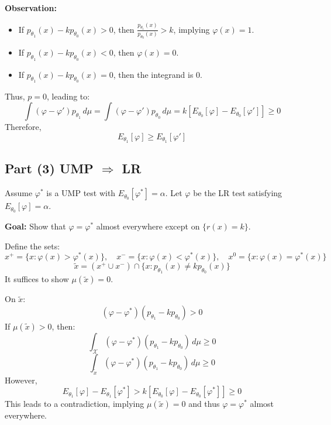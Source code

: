 \documentclass[open=any, 11pt,paper=A4]{scrreprt}
\begin{document}
\textbf{Observation:}
\begin{itemize}
    \item If \( p_{\theta_1}(x) - k p_{\theta_0}(x) > 0 \), then \( \frac{p_{\theta_1}(x)}{p_{\theta_0}(x)} > k \), implying \( \varphi(x) = 1 \).
    \item If \( p_{\theta_1}(x) - k p_{\theta_0}(x) < 0 \), then \( \varphi(x) = 0 \).
    \item If \( p_{\theta_1}(x) - k p_{\theta_0}(x) = 0 \), then the integrand is \( 0 \).
\end{itemize}
Thus, \( p = 0 \), leading to:
\[
\int (\varphi - \varphi') p_{\theta_1} \, d\mu = \int (\varphi - \varphi') p_{\theta_0} \, d\mu = k \left[ E_{\theta_0}[\varphi] - E_{\theta_0}[\varphi'] \right] \geq 0
\]
Therefore,
\[
E_{\theta_1}[\varphi] \geq E_{\theta_1}[\varphi']
\]

\subsection*{Part (3) UMP \(\Rightarrow\) LR}
Assume \( \varphi^* \) is a UMP test with \( E_{\theta_0}[\varphi^*] = \alpha \). Let \( \varphi \) be the LR test satisfying \( E_{\theta_0}[\varphi] = \alpha \).

\textbf{Goal:} Show that \( \varphi = \varphi^* \) almost everywhere except on \( \{ r(x) = k \} \).

Define the sets:
\[
x^+ = \{ x : \varphi(x) > \varphi^*(x) \}, \quad 
x^- = \{ x : \varphi(x) < \varphi^*(x) \}, \quad
x^0 = \{ x : \varphi(x) = \varphi^*(x) \}
\]
\[
\tilde{x} = (x^+ \cup x^-) \cap \{ x : p_{\theta_1}(x) \neq k p_{\theta_0}(x) \}
\]
It suffices to show \( \mu(\tilde{x}) = 0 \).

On \( \tilde{x} \):
\[
(\varphi - \varphi^*) (p_{\theta_1} - k p_{\theta_0}) > 0
\]
If \( \mu(\tilde{x}) > 0 \), then:
\[
\int_{\mathcal{X}} (\varphi - \varphi^*)(p_{\theta_1} - k p_{\theta_0}) \, d\mu \geq 0
\]
\[
\int_{\tilde{x}} (\varphi - \varphi^*)(p_{\theta_1} - k p_{\theta_0}) \, d\mu \geq 0
\]
However,
\[
E_{\theta_1}[\varphi] - E_{\theta_1}[\varphi^*] > k \left[ E_{\theta_0}[\varphi] - E_{\theta_0}[\varphi^*] \right] \geq 0
\]
This leads to a contradiction, implying \( \mu(\tilde{x}) = 0 \) and thus \( \varphi = \varphi^* \) almost everywhere.
\end{document}
